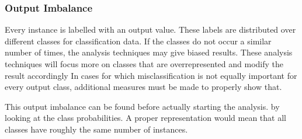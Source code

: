 \documentclass[10pt,a4paper]{article}
\begin{document}
	\subsubsection{Output Imbalance}
	\label{subsec:OutputImbalance}
	
	Every instance is labelled with an output value. These labels are distributed over different classes for classification data. If the classes do not occur a similar number of times, the analysis techniques may give biased results. These analysis techniques will focus more on classes that are overrepresented and modify the result accordingly In cases for which misclassification is not equally important for every output class, additional measures must be made to properly show that.
	
	This output imbalance can be found before actually starting the analysis. by looking at the class probabilities. A proper representation would mean that all classes have roughly the same number of instances. 
	
\end{document}
